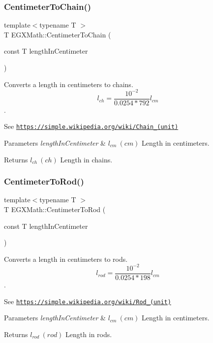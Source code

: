 \subsubsection{\texorpdfstring{Centimeter\+To\+Chain()}{CentimeterToChain()}}
{\footnotesize\ttfamily template$<$typename T $>$ \\
T E\+G\+X\+Math\+::\+Centimeter\+To\+Chain (\begin{DoxyParamCaption}\item[{const T}]{length\+In\+Centimeter }\end{DoxyParamCaption})}



Converts a length in centimeters to chains. \[ l_{ch}= \frac{10^{-2}}{0.0254 * 792} l_{cm} \]. 

See \href{https://simple.wikipedia.org/wiki/Chain_(unit)}{\tt https\+://simple.\+wikipedia.\+org/wiki/\+Chain\+\_\+(unit)} 
\begin{DoxyParams}{Parameters}
{\em length\+In\+Centimeter} & $ l_{cm}\ (cm)$ Length in centimeters. \\
\hline
\end{DoxyParams}
\begin{DoxyReturn}{Returns}
$ l_{ch}\ (ch)$ Length in chains. 
\end{DoxyReturn}
\mbox{\label{group___e_g_x_math-_conversions-_length_conversions-_s_i-_centimeter-_surveyors_gae8148fd547fed6b4308b4ba4b54c2273}} 
\subsubsection{\texorpdfstring{Centimeter\+To\+Rod()}{CentimeterToRod()}}
{\footnotesize\ttfamily template$<$typename T $>$ \\
T E\+G\+X\+Math\+::\+Centimeter\+To\+Rod (\begin{DoxyParamCaption}\item[{const T}]{length\+In\+Centimeter }\end{DoxyParamCaption})}



Converts a length in centimeters to rods. \[ l_{rod}= \frac{10^{-2}}{0.0254 * 198} l_{cm} \]. 

See \href{https://simple.wikipedia.org/wiki/Rod_(unit)}{\tt https\+://simple.\+wikipedia.\+org/wiki/\+Rod\+\_\+(unit)} 
\begin{DoxyParams}{Parameters}
{\em length\+In\+Centimeter} & $ l_{cm}\ (cm)$ Length in centimeters. \\
\hline
\end{DoxyParams}
\begin{DoxyReturn}{Returns}
$ l_{rod}\ (rod)$ Length in rods. 
\end{DoxyReturn}
